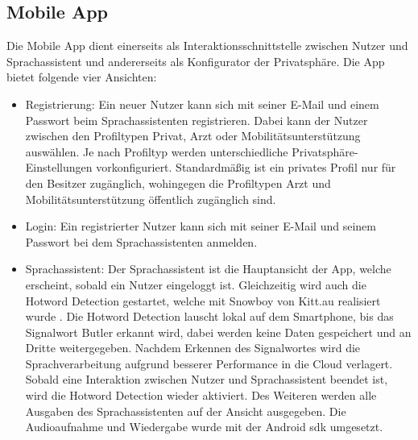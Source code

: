 \subsection{Mobile App}
Die Mobile App dient einerseits als Interaktionsschnittstelle zwischen Nutzer und Sprachassistent und andererseits als Konfigurator der Privatsphäre. Die App bietet folgende vier Ansichten:

\begin{itemize}
    \item Registrierung: Ein neuer Nutzer kann sich mit seiner E-Mail und einem Passwort beim Sprachassistenten registrieren. Dabei kann der Nutzer zwischen den Profiltypen Privat, Arzt oder Mobilitätsunterstützung auswählen. Je nach Profiltyp werden unterschiedliche Privatsphäre-Einstellungen vorkonfiguriert. Standardmäßig ist ein privates Profil nur für den Besitzer zugänglich, wohingegen die Profiltypen Arzt und Mobilitätsunterstützung öffentlich zugänglich sind. 
    \item Login: Ein registrierter Nutzer kann sich mit seiner E-Mail und seinem Passwort bei dem Sprachassistenten anmelden.
    \item Sprachassistent: Der Sprachassistent ist die Hauptansicht der App, welche erscheint, sobald ein Nutzer eingeloggt ist. Gleichzeitig wird auch die Hotword Detection gestartet, welche mit Snowboy von Kitt.au realisiert wurde \cite{SnowboyHotwordDetection}. Die Hotword Detection lauscht lokal auf dem Smartphone, bis das Signalwort \glqq Butler\grqq{} erkannt wird, dabei werden keine Daten gespeichert und an Dritte weitergegeben. Nachdem Erkennen des Signalwortes wird die Sprachverarbeitung aufgrund besserer Performance in die Cloud verlagert. Sobald eine Interaktion zwischen Nutzer und Sprachassistent beendet ist, wird die Hotword Detection wieder aktiviert. Des Weiteren werden alle Ausgaben des Sprachassistenten auf der Ansicht ausgegeben. Die Audioaufnahme und Wiedergabe wurde mit der Android \acrshort{sdk} umgesetzt.

\end{itemize}
